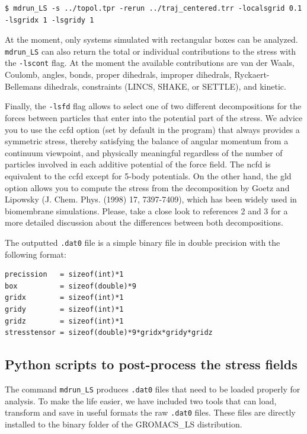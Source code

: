 \documentclass[10pt,letterpaper,notitlepage]{article}
\begin{document}
\begin{lstlisting}[caption=Setting the grid size]
$ mdrun_LS -s ../topol.tpr -rerun ../traj_centered.trr -localsgrid 0.1 -lsgridx 1 -lsgridy 1
\end{lstlisting}
At the moment, only systems simulated with rectangular boxes can be analyzed. \texttt{mdrun\_LS} can also return the total or individual contributions to the stress with the \texttt{-lscont} flag. At the moment the available contributions are van der Waals, Coulomb, angles, bonds, proper dihedrals, improper dihedrals, Ryckaert-Bellemans dihedrals, constraints (LINCS, SHAKE, or SETTLE), and kinetic. 

Finally, the \texttt{-lsfd} flag allows to select one of two different decompositions for the forces between particles that enter into the potential part of the stress. We advice you to use the ccfd option (set by default in the program) that always provides a symmetric stress, thereby satisfying the balance of angular momentum from a continuum viewpoint, and physically meaningful regardless of the number of particles involved in each additive potential of the force field. The ncfd is equivalent to the ccfd except for 5-body potentials. On the other hand, the gld option allows you to compute the stress from the decomposition by Goetz and Lipowsky (J. Chem. Phys. (1998) 17, 7397-7409), which has been widely used in biomembrane simulations. Please, take a close look to references 2 and 3 for a more detailed discussion about the differences between both decompositions.


The outputted \texttt{.dat0} file is a simple binary file in double precision with the following format:
\begin{lstlisting}[caption=Format of the \texttt{.dat0} binary file]
precission   = sizeof(int)*1
box          = sizeof(double)*9
gridx        = sizeof(int)*1
gridy        = sizeof(int)*1
gridz        = sizeof(int)*1
stresstensor = sizeof(double)*9*gridx*gridy*gridz
\end{lstlisting}

\subsection{Python scripts to post-process the stress fields \label{postprocess}}

The command \texttt{mdrun\_LS} produces \texttt{.dat0} files that need to be loaded properly for analysis. To make the life easier, we have included two tools that can load, transform and save in useful formats the raw \texttt{.dat0} files. These files are directly installed to the binary folder of the GROMACS\_LS distribution. 
\end{document}

